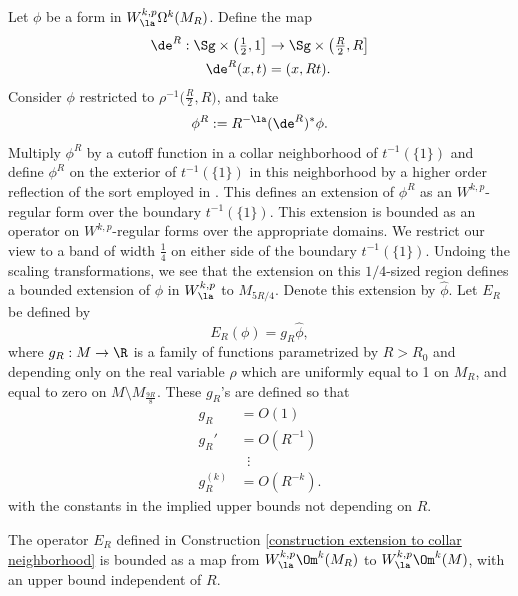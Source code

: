 \documentclass[hidelinks, 12pt, oneside, reqno]{amsart}
\begin{document}
\begin{constr}\label{construction extension to collar neighborhood}
Let $\phi$ be a form in $W^{k,p}_{\la}\Omega^k(M_R)$. Define the map
\begin{align*}
    \de^R : \Sg \times \big(\tfrac12, 1\big] &\rightarrow \Sg \times \big(\tfrac{R}{2}, R \big]\\
    \de^R(x, t) &= (x,Rt).
\end{align*}
Consider $\phi$ restricted to $\rho^{-1}\big(\frac{R}{2}, R \big)$, and take 
\[
\phi^R := R^{-\la} (\de^R)^* \phi.
\]
Multiply $\phi^R$ by a cutoff function in a collar neighborhood of $t^{-1}(\{1\})$ and define $\phi^R$ on the exterior of $t^{-1}(\{1\})$ in this neighborhood by a higher order reflection of the sort employed in \cite[Corollary 1.3.7]{HamiltonNashMoser}. This defines an extension of $\phi^R$ as an $W^{k,p}$-regular form over the boundary $t^{-1}(\{1\})$. This extension is bounded as an operator on $W^{k,p}$-regular forms over the appropriate domains. We restrict our view to a band of width $\tfrac{1}{4}$ on either side of the boundary $t^{-1}(\{1\})$. Undoing the scaling transformations, we see that the extension on this $1/4$-sized region defines a bounded extension of $\phi$ in $W^{k,p}_{\la}$ to $M_{5R/4}$. Denote this extension by $\hat \phi$. Let $E_R$ be defined by
\[
E_R(\phi) = g_R \hat \phi,
\]
where $g_R: M \rightarrow \R$ is a family of functions parametrized by $R > R_0$ and depending only on the real variable $\rho$ which are uniformly equal to 1 on $M_R$, and equal to zero on $M\setminus M_{\frac{9R}{8}}$. These $g_R$'s are defined so that
\begin{align*}
    g_R &= O(1)\\
    g_R'&=O(R^{-1})\\
    &\;\; \vdots \\
    g_R^{(k)} &= O(R^{-k}).
\end{align*}
with the constants in the implied upper bounds not depending on $R$. 
\end{constr}

\begin{lem}\label{lemma extension of functions}
The operator $E_R$ defined in Construction \ref{construction extension to collar neighborhood} is bounded as a map from $W^{k,p}_\la \Om^k(M_R)$ to $W^{k,p}_{\la} \Om^k (M)$, with an upper bound independent of $R$.
\end{lem}
\end{document}
